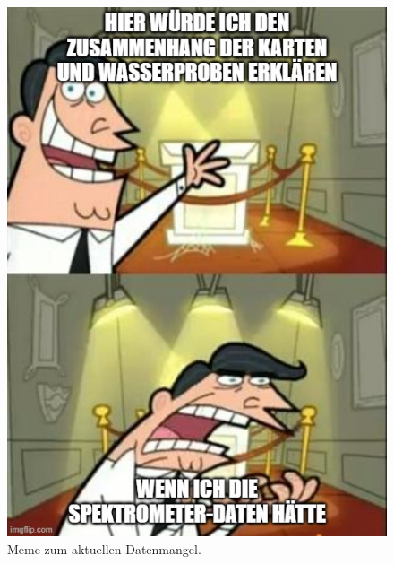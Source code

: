 \begin{figure}[H]
    \begin{minipage}{0.9\textwidth}
        \centering
        \includegraphics[width=\linewidth]{Bilder/QGIS/ifihadany.jpg}
        \caption{Meme zum aktuellen Datenmangel.}
\end{minipage}
\end{figure}


